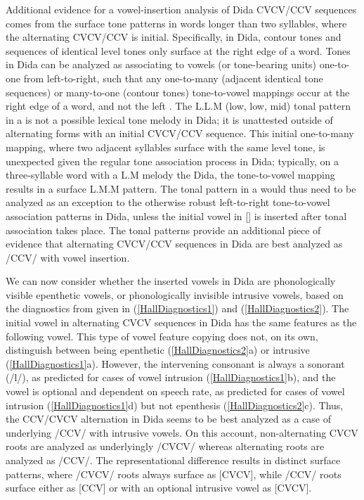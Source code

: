 \documentclass[output=paper,colorlinks,citecolor=brown]{langscibook}
\begin{document}
Additional evidence for a vowel-insertion analysis of Dida CVCV\slash CCV sequences comes from the surface tone patterns in words longer than two syllables, where the alternating CVCV\slash CCV is initial. Specifically, in Dida, contour tones and sequences of identical level tones only surface at the right edge of a word. Tones in Dida can be analyzed as associating to vowels (or tone-bearing units) one-to-one from left-to-right, such that any one-to-many (adjacent identical tone sequences) or many-to-one (contour tones) tone-to-vowel mappings occur at the right edge of a word, and not the left \citep{Guehoun:1993}. The L.L.M (low, low, mid) tonal pattern in a is not a possible lexical tone melody in Dida; it is unattested outside of alternating forms with an initial CVCV\slash CCV sequence. This initial one-to-many mapping, where two adjacent syllables surface with the same level tone, is unexpected given the regular tone association process in Dida; typically, on a three-syllable word with a L.M melody the Dida, the tone-to-vowel mapping results in a surface L.M.M pattern. The tonal pattern in a would thus need to be analyzed as an exception to the otherwise robust left-to-right tone-to-vowel association patterns in Dida, unless the initial vowel in [] is inserted after tonal association takes place. The tonal patterns provide an additional piece of evidence that alternating CVCV\slash CCV sequences in Dida are best analyzed as /CCV/ with vowel insertion.

We can now consider whether the inserted vowels in Dida are phonologically visible epenthetic vowels, or phonologically invisible intrusive vowels, based on the diagnostics from \citet{Hall2006} given in (\ref{HallDiagnostics1}) and (\ref{HallDiagnostics2}). The initial vowel in alternating CVCV sequences in Dida has the same features as the following vowel. This type of vowel feature copying does not, on its own, distinguish between being epenthetic (\ref{HallDiagnostics2}a) or intrusive (\ref{HallDiagnostics1}a). However, the intervening consonant is always a sonorant (/l/), as predicted for cases of vowel intrusion (\ref{HallDiagnostics1}b), and the vowel is optional and dependent on speech rate, as predicted for cases of vowel intrusion (\ref{HallDiagnostics1}d) but not epenthesis (\ref{HallDiagnostics2}c). Thus, the CCV/CVCV alternation in Dida seems to be best analyzed as a case of underlying /CCV/ with intrusive vowels. On this account, non-alternating CVCV roots are analyzed as underlyingly /CVCV/ whereas alternating roots are analyzed as /CCV/. The representational difference results in distinct surface patterns, where /CVCV/ roots always surface as [CVCV], while /CCV/ roots surface either as [CCV] or with an optional intrusive vowel as [CVCV].
\end{document}
